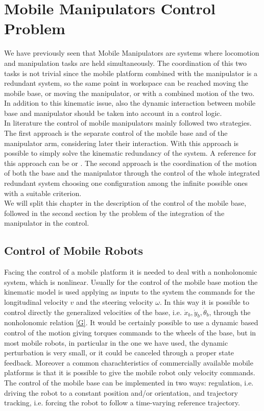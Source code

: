 \chapter{Mobile Manipulators Control Problem}
\label{chapter4}
We have previously seen that Mobile Manipulators are systems where locomotion and manipulation tasks are held simultaneously. The coordination of this two tasks is not trivial since the mobile platform combined with the manipulator is a redundant system, so the same point in workspace can be reached moving the mobile base, or moving the manipulator, or with a combined motion of the two. In addition to this kinematic issue, also the dynamic interaction between mobile base and manipulator should be taken into account in a control logic. \\
In literature the control of mobile manipulators mainly followed two strategies. The first approach is the separate control of the mobile base and of the manipulator arm, considering later their interaction. With this approach is possible to simply solve the kinematic redundancy of the system. A reference for this approach can be \cite{liulewis} or \cite{chung1998interaction}. The second approach is the coordination of the motion of both the base and the manipulator through the control of the whole integrated redundant system choosing one configuration among the infinite possible ones with a suitable criterion.\\
We will split this chapter in the description of the control of the mobile base, followed in the second section by the problem of the integration of the manipulator in the control.
\section{Control of Mobile Robots}
Facing the control of a mobile platform it is needed to deal with a nonholonomic system, which is nonlinear.
Usually for the control of the mobile base motion the kinematic model is used applying as inputs to the system the commands for the longitudinal velocity $v$ and the steering velocity $\omega$. In this way it is possible to control directly the generalized velocities of the base, i.e. $\dot{x}_b,\dot{y}_b,\dot{\theta}_b$, through the nonholonomic relation \ref{G}.
It would be certainly possible to use a dynamic based control of the motion giving torques commands to the wheels of the base, but in most mobile robots, in particular in the one we have used, the dynamic perturbation is very small, or it could be canceled through a proper state feedback. Moreover a common charachteristics of commercially available mobile platforms is that it is possible to give the mobile robot only velocity commands.\\
The control of the mobile base can be implemented in two ways: regulation, i.e. driving the robot to a constant position and/or orientation, and trajectory tracking, i.e. forcing the robot to follow a time-varying reference trajectory.
